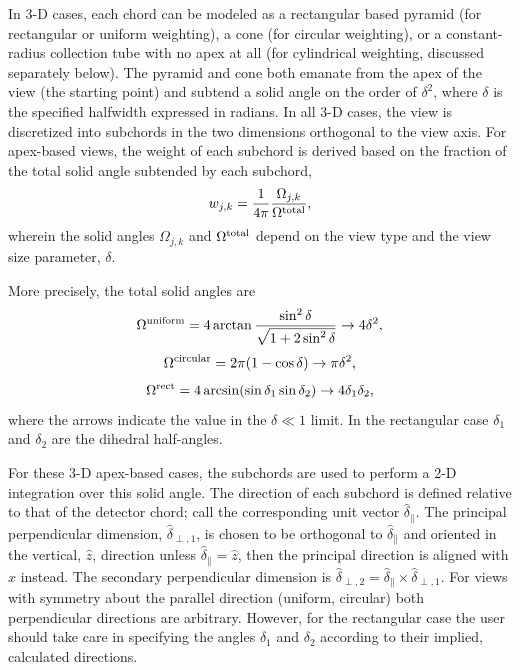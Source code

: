 \documentclass[12pt]{report}
\begin{document}
In 3-D cases, each chord can be modeled as a rectangular based pyramid
(for rectangular or uniform weighting), a cone (for circular weighting),
or a constant-radius collection tube with no apex at all (for
cylindrical weighting, discussed separately below). The pyramid and
cone both emanate from the apex of the view (the starting point) and
subtend a solid angle on the order of $\delta^{2}$, where $\delta$ is
the specified halfwidth expressed in radians. In all 3-D cases, the view is discretized into
subchords in the two dimensions orthogonal to the view axis.  For apex-based views, 
the weight of each subchord is derived based on the fraction of the total solid angle
subtended by each subchord,
\begin{equation}\label{eq:general_subchord_weight}
w_{j,k} = \frac{1}{4\pi}\frac{\Omega_{j,k}}{\Omega^{\rm total}},
\end{equation}
wherein the solid angles $\Omega_{j,k}$ and $\Omega^{\rm total}$ depend on the view type
and the view size parameter, $\delta$.

More precisely, the total solid angles are
\begin{equation}
\Omega^{\rm uniform} = 4 \arctan \frac{\sin^{2} \delta}{\sqrt{1
+ 2 \sin^{2} \delta}} \rightarrow 4 \delta^{2},
\end{equation}
\begin{equation}
\Omega^{\rm circular} = 2 \pi (1 - \cos \delta) \rightarrow \pi
\delta^{2},
\end{equation}
\begin{equation}
\Omega^{\rm rect} = 4\arcsin(\sin \delta_1 \sin \delta_2) \rightarrow 4
\delta_1 \delta_2,
\end{equation}
where the arrows indicate the value in the $\delta \ll 1$ limit.
In the rectangular case $\delta_1$ and $\delta_2$ are the dihedral half-angles.

For these 3-D apex-based cases, the subchords are used to perform a 2-D integration over this solid
angle. The direction of each subchord is defined relative to that
of the detector chord; call the corresponding unit vector
$\hat{\delta}_{\parallel}$. The principal perpendicular dimension,
$\hat{\delta}_{\perp,1}$, is chosen to be orthogonal to
$\hat{\delta}_{\parallel}$ and oriented in the vertical, $\hat{z}$,
direction unless $\hat{\delta}_{\parallel} = \hat{z}$, then the
principal direction is aligned with $\hat{x}$ instead. The secondary
perpendicular dimension is
$\hat{\delta}_{\perp,2} = \hat{\delta}_{\parallel} \times
\hat{\delta}_{\perp,1}$.
For views with symmetry about the parallel direction (uniform, circular)
both perpendicular directions are arbitrary. However,
for the rectangular case the user should take care in specifying the
angles $\delta_1$ and $\delta_2$ according to their implied, calculated directions.
\end{document}
